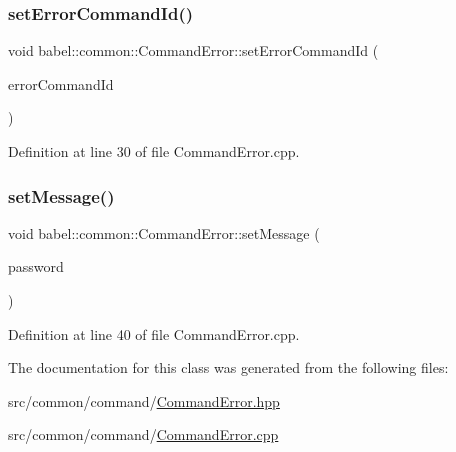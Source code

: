 \subsubsection{\texorpdfstring{set\+Error\+Command\+Id()}{setErrorCommandId()}}
{\footnotesize\ttfamily void babel\+::common\+::\+Command\+Error\+::set\+Error\+Command\+Id (\begin{DoxyParamCaption}\item[{\mbox{\hyperlink{namespacebabel_1_1common_a2d31f246c776da6bf656bd71e86cbb2c}{Command\+Name}}}]{error\+Command\+Id }\end{DoxyParamCaption})}



Definition at line 30 of file Command\+Error.\+cpp.

\mbox{\label{classbabel_1_1common_1_1_command_error_af949fce1cea9f29aecdfa941df8bcdaa}} 
\subsubsection{\texorpdfstring{set\+Message()}{setMessage()}}
{\footnotesize\ttfamily void babel\+::common\+::\+Command\+Error\+::set\+Message (\begin{DoxyParamCaption}\item[{const std\+::string \&}]{password }\end{DoxyParamCaption})}



Definition at line 40 of file Command\+Error.\+cpp.



The documentation for this class was generated from the following files\+:\begin{DoxyCompactItemize}
\item 
src/common/command/\mbox{\hyperlink{_command_error_8hpp}{Command\+Error.\+hpp}}\item 
src/common/command/\mbox{\hyperlink{_command_error_8cpp}{Command\+Error.\+cpp}}\end{DoxyCompactItemize}
